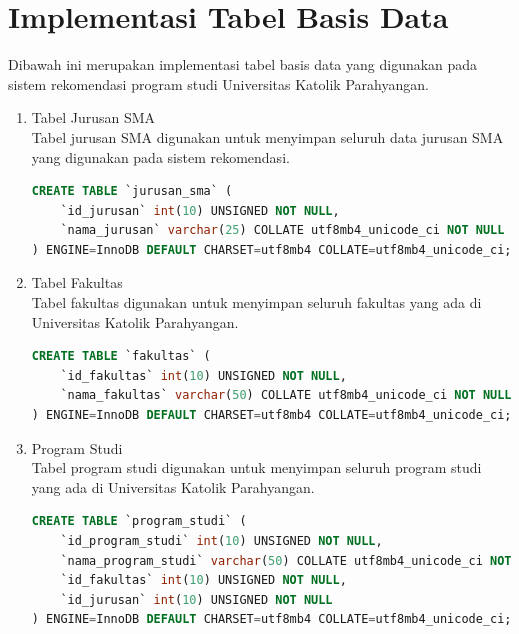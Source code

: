 \section{Implementasi Tabel Basis Data}
\label{sec:implementasi tabel basis data}

Dibawah ini merupakan implementasi tabel basis data yang digunakan pada sistem rekomendasi program studi Universitas Katolik Parahyangan. 

\lstset{numbers=left}

\begin{enumerate}
    \item Tabel Jurusan SMA\\
    Tabel jurusan SMA digunakan untuk menyimpan seluruh data jurusan SMA yang digunakan pada sistem rekomendasi.
    
    \begin{lstlisting}[language=SQL, caption=Implementasi tabel jurusan SMA]
CREATE TABLE `jurusan_sma` ( 
    `id_jurusan` int(10) UNSIGNED NOT NULL,
    `nama_jurusan` varchar(25) COLLATE utf8mb4_unicode_ci NOT NULL
) ENGINE=InnoDB DEFAULT CHARSET=utf8mb4 COLLATE=utf8mb4_unicode_ci;
    \end{lstlisting}
    
    \item Tabel Fakultas\\
    Tabel fakultas digunakan untuk menyimpan seluruh fakultas yang ada di Universitas Katolik Parahyangan.
    
    \begin{lstlisting}[language=SQL, caption=Implementasi tabel ]
CREATE TABLE `fakultas` (
    `id_fakultas` int(10) UNSIGNED NOT NULL,
    `nama_fakultas` varchar(50) COLLATE utf8mb4_unicode_ci NOT NULL
) ENGINE=InnoDB DEFAULT CHARSET=utf8mb4 COLLATE=utf8mb4_unicode_ci;    
    \end{lstlisting}

    \item Program Studi\\
    Tabel program studi digunakan untuk menyimpan seluruh program studi yang ada di Universitas Katolik Parahyangan.
    
    \begin{lstlisting}[language=SQL, caption=Implementasi tabel ]
CREATE TABLE `program_studi` (
    `id_program_studi` int(10) UNSIGNED NOT NULL,
    `nama_program_studi` varchar(50) COLLATE utf8mb4_unicode_ci NOT NULL,
    `id_fakultas` int(10) UNSIGNED NOT NULL,
    `id_jurusan` int(10) UNSIGNED NOT NULL
) ENGINE=InnoDB DEFAULT CHARSET=utf8mb4 COLLATE=utf8mb4_unicode_ci;
    

\end{lstlisting}
\end{enumerate}
